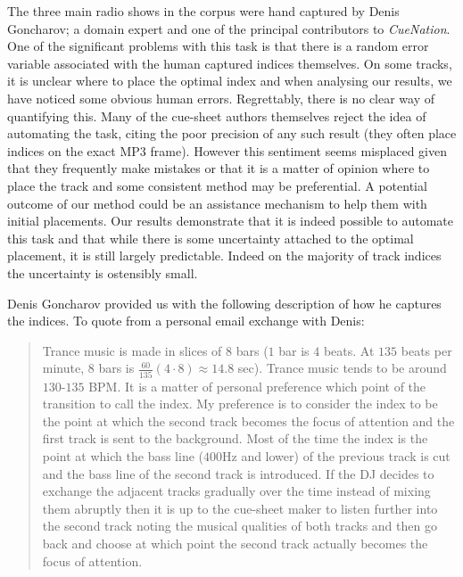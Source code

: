 \documentclass[twocolumn]{article}
\begin{document}
	The three main radio shows in the corpus were hand captured by Denis Goncharov; a domain expert and one of the principal contributors to \textit{CueNation}. One of the significant problems with this task is that there is a random error variable associated with the human captured indices themselves. On some tracks, it is unclear where to place the optimal index and when analysing our results, we have noticed some obvious human errors. Regrettably, there is no clear way of quantifying this. Many of the cue-sheet authors themselves reject the idea of automating the task, citing the poor precision of any such result (they often place indices on the exact MP3 frame). However this sentiment seems misplaced given that they frequently make mistakes or that it is a matter of opinion where to place the track and some consistent method may be preferential. A potential outcome of our method could be an assistance mechanism to help them with initial placements. Our results demonstrate that it is indeed possible to automate this task and that while there is some uncertainty attached to the optimal placement, it is still largely predictable. Indeed on the majority of track indices the uncertainty is ostensibly small. 
	
	Denis Goncharov provided us with the following description of how he captures the indices. To quote from a personal email exchange with Denis:
	
	\begin{quote}
		Trance music is made in slices of $8$ bars ($1$ bar is $4$ beats. At $135$ beats per minute, $8$ bars is $\frac{60}{135} ( 4 \cdot 8 ) \approx 14.8$ sec). Trance music tends to be around $130$-$135$ BPM. It is a matter of personal preference which point of the transition to call the index. My preference is to consider the index to be the point at which the second track becomes the focus of attention and the first track is sent to the background. Most of the time the index is the point at which the bass line ($400$Hz and lower) of the previous track is cut and the bass line of the second track is introduced. If the DJ decides to exchange the adjacent tracks gradually over the time instead of mixing them abruptly then it is up to the cue-sheet maker to listen further into the second track noting the musical qualities of both tracks and then go back and choose at which point the second track actually becomes the focus of attention.
	\end{quote}
	
\end{document}
